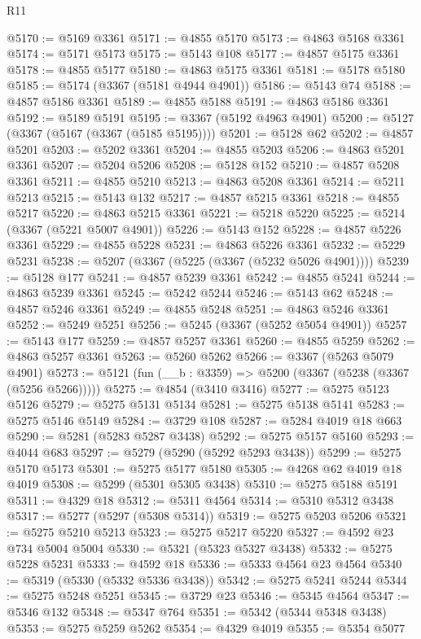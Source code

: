 \begin{lexlean}{R11}
\begin{coremodule}
@5170 := @5169 @3361
@5171 := @4855 @5170
@5173 := @4863 @5168 @3361
@5174 := @5171 @5173
@5175 := @5143 @108
@5177 := @4857 @5175 @3361
@5178 := @4855 @5177
@5180 := @4863 @5175 @3361
@5181 := @5178 @5180
@5185 := @5174 (@3367 (@5181 @4944 @4901))
@5186 := @5143 @74
@5188 := @4857 @5186 @3361
@5189 := @4855 @5188
@5191 := @4863 @5186 @3361
@5192 := @5189 @5191
@5195 := @3367 (@5192 @4963 @4901)
@5200 := @5127 (@3367 (@5167 (@3367 (@5185 @5195))))
@5201 := @5128 @62
@5202 := @4857 @5201
@5203 := @5202 @3361
@5204 := @4855 @5203
@5206 := @4863 @5201 @3361
@5207 := @5204 @5206
@5208 := @5128 @152
@5210 := @4857 @5208 @3361
@5211 := @4855 @5210
@5213 := @4863 @5208 @3361
@5214 := @5211 @5213
@5215 := @5143 @132
@5217 := @4857 @5215 @3361
@5218 := @4855 @5217
@5220 := @4863 @5215 @3361
@5221 := @5218 @5220
@5225 := @5214 (@3367 (@5221 @5007 @4901))
@5226 := @5143 @152
@5228 := @4857 @5226 @3361
@5229 := @4855 @5228
@5231 := @4863 @5226 @3361
@5232 := @5229 @5231
@5238 := @5207 (@3367 (@5225 (@3367 (@5232 @5026 @4901))))
@5239 := @5128 @177
@5241 := @4857 @5239 @3361
@5242 := @4855 @5241
@5244 := @4863 @5239 @3361
@5245 := @5242 @5244
@5246 := @5143 @62
@5248 := @4857 @5246 @3361
@5249 := @4855 @5248
@5251 := @4863 @5246 @3361
@5252 := @5249 @5251
@5256 := @5245 (@3367 (@5252 @5054 @4901))
@5257 := @5143 @177
@5259 := @4857 @5257 @3361
@5260 := @4855 @5259
@5262 := @4863 @5257 @3361
@5263 := @5260 @5262
@5266 := @3367 (@5263 @5079 @4901)
@5273 := @5121 (fun (__b : @3359) => @5200 (@3367 (@5238 (@3367 (@5256 @5266)))))
@5275 := @4854 (@3410 @3416)
@5277 := @5275 @5123 @5126
@5279 := @5275 @5131 @5134
@5281 := @5275 @5138 @5141
@5283 := @5275 @5146 @5149
@5284 := @3729 @108
@5287 := @5284 @4019 @18 @663
@5290 := @5281 (@5283 @5287 @3438)
@5292 := @5275 @5157 @5160
@5293 := @4044 @683
@5297 := @5279 (@5290 (@5292 @5293 @3438))
@5299 := @5275 @5170 @5173
@5301 := @5275 @5177 @5180
@5305 := @4268 @62 @4019 @18 @4019
@5308 := @5299 (@5301 @5305 @3438)
@5310 := @5275 @5188 @5191
@5311 := @4329 @18
@5312 := @5311 @4564
@5314 := @5310 @5312 @3438
@5317 := @5277 (@5297 (@5308 @5314))
@5319 := @5275 @5203 @5206
@5321 := @5275 @5210 @5213
@5323 := @5275 @5217 @5220
@5327 := @4592 @23 @734 @5004 @5004
@5330 := @5321 (@5323 @5327 @3438)
@5332 := @5275 @5228 @5231
@5333 := @4592 @18
@5336 := @5333 @4564 @23 @4564
@5340 := @5319 (@5330 (@5332 @5336 @3438))
@5342 := @5275 @5241 @5244
@5344 := @5275 @5248 @5251
@5345 := @3729 @23
@5346 := @5345 @4564
@5347 := @5346 @132
@5348 := @5347 @764
@5351 := @5342 (@5344 @5348 @3438)
@5353 := @5275 @5259 @5262
@5354 := @4329 @4019
@5355 := @5354 @5077

\end{coremodule}
\end{lexlean}
